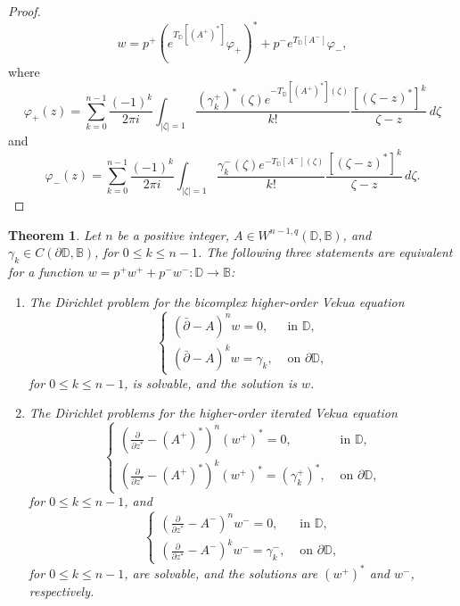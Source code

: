 \documentclass[12pt,reqno]{amsart}
\newtheorem{theorem}{Theorem}[section]
\theoremstyle{definition}
\theoremstyle{remark}
\newcommand{\p}{\partial}
\newcommand{\dbar}{\bar\partial}
\newcommand{\bc}{\mathbb{B}}
\newcommand{\disk}{\mathbb{D}}
\begin{document}
\begin{proof}
                \[
                    w = p^+ (e^{T_\disk[(A^+)^*]}  \varphi_+)^* + p^- e^{T_\disk[A^-]} \varphi_-, 
                \]
                where
                \[
                     \varphi_+(z) =  \sum_{k=0}^{n-1} \frac{(-1)^k}{2\pi i} \int_{|\zeta| = 1} \frac{(\gamma_k^+)^*(\zeta)e^{-T_\disk[(A^+)^*](\zeta)}}{k!} \frac{[(\zeta - z)^*]^k}{\zeta - z}\,d\zeta 
                \]
                and
                \[
                     \varphi_-(z) =  \sum_{k=0}^{n-1} \frac{(-1)^k}{2\pi i} \int_{|\zeta| = 1} \frac{\gamma_k^-(\zeta)e^{-T_\disk[A^-](\zeta)}}{k!} \frac{[(\zeta - z)^*]^k}{\zeta - z}\,d\zeta .
                \]
                \end{proof}

            \begin{theorem}
                 Let $n$ be a positive integer, $A \in W^{n-1,q}(\disk,\bc)$, and $\gamma_k \in C(\p\disk,\bc)$, for $0 \leq k \leq n-1$. 
                 The following three statements are equivalent for a function $w = p^+ w^+ + p^- w^-:\disk\to\bc$:
                    \begin{enumerate}
                        \item The Dirichlet problem for the bicomplex higher-order Vekua equation
                        \[
                            \begin{cases}
                            (\dbar - A)^n w = 0, & \text{ in } \disk, \\
                            (\dbar - A)^k w = \gamma_k, & \text{ on } \p\disk,
                            \end{cases}
                        \]
                        for $0 \leq k \leq n-1$, is solvable, and the solution is $w$.
                        
                        \item The Dirichlet problems for the higher-order iterated Vekua equation
                        \[
                            \begin{cases}
                                \left( \frac{\p}{\p z^*} - (A^+)^*\right)^n (w^+)^* = 0, & \text{ in } \disk,\\
                                \left( \frac{\p}{\p z^*} - (A^+)^*\right)^k (w^+)^* = (\gamma_k^+)^*, & \text{ on } \p\disk,
                            \end{cases}
                        \]
                        for $0 \leq k \leq n-1$, and
                        \[
                            \begin{cases}
                                \left( \frac{\p}{\p z^*} - A^-\right)^n w^- = 0, & \text{ in } \disk,\\
                                \left( \frac{\p}{\p z^*} - A^-\right)^k w^- = \gamma_k^-, & \text{ on } \p\disk,
                            \end{cases}
                        \]
                        for $0 \leq k \leq n-1$, are solvable, and the solutions are $(w^+)^*$ and $w^-$, respectively.
                        

\end{enumerate}
\end{theorem}
\end{document}
